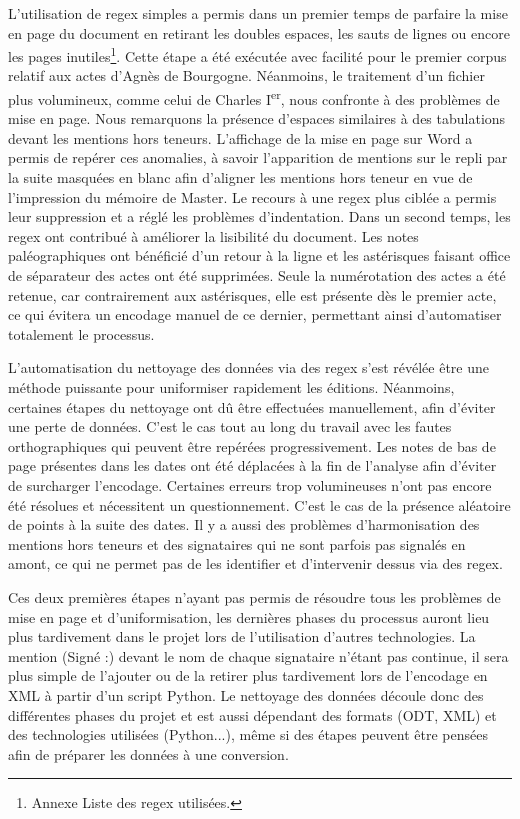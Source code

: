 \par L’utilisation de regex simples a permis dans un premier temps de parfaire la mise en page du document en retirant les doubles espaces, les sauts de lignes ou encore les pages inutiles\footnote{Annexe Liste des regex utilisées.}. Cette étape a été exécutée avec facilité pour le premier corpus relatif aux actes d’Agnès de Bourgogne. Néanmoins, le traitement d’un fichier plus volumineux, comme celui de Charles I\textsuperscript{er}, nous confronte à des problèmes de mise en page. Nous remarquons la présence d’espaces similaires à des tabulations devant les mentions hors teneurs. L’affichage de \og la mise en page \fg \space sur Word a permis de repérer ces anomalies, à savoir l’apparition de mentions \og sur le repli \fg \space par la suite masquées en blanc afin d’aligner les mentions hors teneur en vue de l'impression du mémoire de Master. Le recours à une regex plus ciblée a permis leur suppression et a réglé les problèmes d’indentation. Dans un second temps, les regex ont contribué à améliorer la lisibilité du document. Les notes paléographiques ont bénéficié d’un retour à la ligne et les astérisques faisant office de séparateur des actes ont été supprimées. Seule la numérotation des actes a été retenue, car contrairement aux astérisques, elle est présente dès le premier acte, ce qui évitera un encodage manuel de ce dernier, permettant ainsi d'automatiser totalement le processus. 
\newpage 

\par L'automatisation du nettoyage des données via des regex s’est révélée être une méthode puissante pour uniformiser rapidement les éditions. Néanmoins, certaines étapes du nettoyage ont dû être effectuées manuellement, afin d'éviter une perte de données. C’est le cas tout au long du travail avec les fautes orthographiques qui peuvent être repérées progressivement. Les notes de bas de page présentes dans les dates ont été déplacées à la fin de l'analyse afin d'éviter de surcharger l'encodage. Certaines erreurs trop volumineuses n’ont pas encore été résolues et nécessitent un questionnement. C’est le cas de la présence aléatoire de points à la suite des dates. Il y a aussi des problèmes d’harmonisation des mentions hors teneurs et des signataires qui ne sont parfois pas signalés en amont, ce qui ne permet pas de les identifier et d'intervenir dessus via des regex. 
\newline 

\par Ces deux premières étapes n’ayant pas permis de résoudre tous les problèmes de mise en page et d’uniformisation, les dernières phases du processus auront lieu plus tardivement dans le projet lors de l’utilisation d’autres technologies. La mention \og (Signé :) \fg \space devant le nom de chaque signataire n’étant pas continue, il sera plus simple de l’ajouter ou de la retirer plus tardivement lors de l'encodage en XML à partir d'un script Python. Le nettoyage des données découle donc des différentes phases du projet et est aussi dépendant des formats (ODT, XML) et des technologies utilisées (Python...), même si des étapes peuvent être pensées afin de préparer les données à une conversion.

